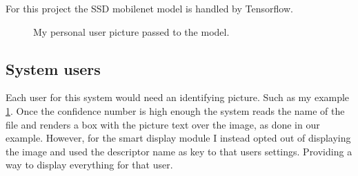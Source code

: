 \documentclass[10pt,twocolumn,letterpaper]{article}
\begin{document}
For this project the SSD mobilenet model is handled by Tensorflow.
\begin{figure}
\begin{center}
\end{center}
   \caption{My personal user picture passed to the model.}
\label{fig:long}
\label{fig:onecol}
\end{figure}


\subsection{System users}

Each user for this system would need an identifying picture. Such as my example \ref{fig:onecol}.  Once the confidence number is high enough the system reads the name of the file and renders a box with the picture text over the image, as done in our example.  However, for the smart display module I instead opted out of displaying the image and used the descriptor name as key to that users settings.  Providing a way to display everything for that user.
\end{document}
